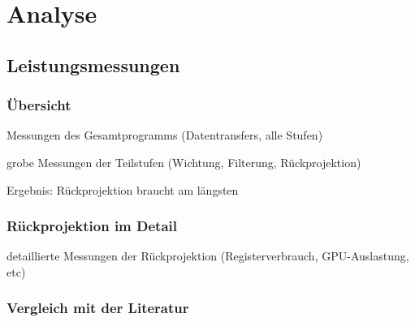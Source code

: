 \chapter{Analyse}

\section{Leistungsmessungen}

\subsection{Übersicht}

Messungen des Gesamtprogramms (Datentransfers, alle Stufen)

grobe Messungen der Teilstufen (Wichtung, Filterung, Rückprojektion)

Ergebnis: Rückprojektion braucht am längsten

\subsection{Rückprojektion im Detail}

detaillierte Messungen der Rückprojektion (Registerverbrauch, GPU-Auslastung, etc)

\subsection{Vergleich mit der Literatur}
